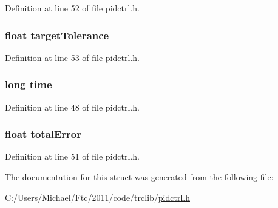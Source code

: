 Definition at line 52 of file pidctrl.h.

\hypertarget{struct_p_i_d_c_t_r_l_ac9724415d7343c756012787cb48fcbe3}{
\subsubsection[{targetTolerance}]{\setlength{\rightskip}{0pt plus 5cm}float {\bf targetTolerance}}}
\label{struct_p_i_d_c_t_r_l_ac9724415d7343c756012787cb48fcbe3}


Definition at line 53 of file pidctrl.h.

\hypertarget{struct_p_i_d_c_t_r_l_a8667588dec524bf854d0c16771d425a1}{
\subsubsection[{time}]{\setlength{\rightskip}{0pt plus 5cm}long {\bf time}}}
\label{struct_p_i_d_c_t_r_l_a8667588dec524bf854d0c16771d425a1}


Definition at line 48 of file pidctrl.h.

\hypertarget{struct_p_i_d_c_t_r_l_a4493bf9bc4dbf87a1d24fdd875b89dde}{
\subsubsection[{totalError}]{\setlength{\rightskip}{0pt plus 5cm}float {\bf totalError}}}
\label{struct_p_i_d_c_t_r_l_a4493bf9bc4dbf87a1d24fdd875b89dde}


Definition at line 51 of file pidctrl.h.



The documentation for this struct was generated from the following file:\begin{DoxyCompactItemize}
\item 
C:/Users/Michael/Ftc/2011/code/trclib/\hyperlink{pidctrl_8h}{pidctrl.h}\end{DoxyCompactItemize}
